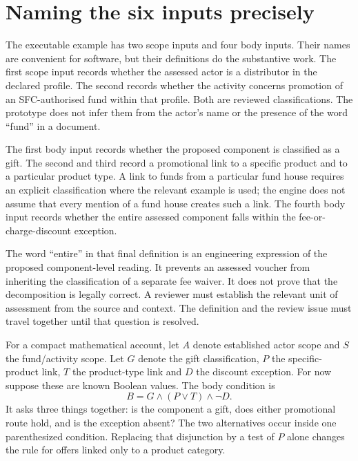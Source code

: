 \documentclass[12pt,a4paper,oneside,openany]{book}
\begin{document}
\section{Naming the six inputs precisely}
\label{merge:M02:02}

\label{sec:circular-inputs}
The executable example has two scope inputs and four body inputs. Their names
are convenient for software, but their definitions do the substantive work.
The first scope input records whether the assessed actor is a distributor in
the declared profile. The second records whether the activity concerns promotion
of an SFC-authorised fund within that profile. Both are reviewed classifications.
The prototype does not infer them from the actor's name or the presence of the
word ``fund'' in a document.

The first body input records whether the proposed component is classified as a
gift. The second and third record a promotional link to a specific product and
to a particular product type. A link to funds from a particular fund house
requires an explicit classification where the relevant example is used; the
engine does not assume that every mention of a fund house creates such a link.
The fourth body input records whether the entire assessed component falls
within the fee-or-charge-discount exception.

The word ``entire'' in that final definition is an engineering expression of
the proposed component-level reading. It prevents an assessed voucher from
inheriting the classification of a separate fee waiver. It does not prove that
the decomposition is legally correct. A reviewer must establish the relevant
unit of assessment from the source and context. The definition and the review
issue must travel together until that question is resolved.

For a compact mathematical account, let $A$ denote established actor scope and
$S$ the fund/activity scope. Let $G$ denote the gift classification, $P$ the
specific-product link, $T$ the product-type link and $D$ the discount exception.
For now suppose these are known Boolean values. The body condition is
\begin{equation}
 B=G\land(P\lor T)\land\neg D.
 \label{eq:gift-body}
\end{equation}
It asks three things together: is the component a gift, does either promotional
route hold, and is the exception absent? The two alternatives occur inside one
parenthesized condition. Replacing that disjunction by a test of $P$ alone
changes the rule for offers linked only to a product category.
\end{document}

